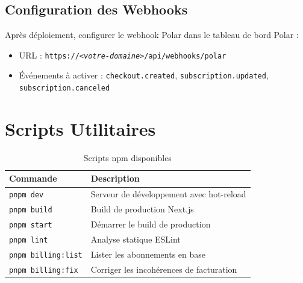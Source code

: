 \documentclass[12pt, a4paper, twoside]{report}
\begin{document}
\subsection{Configuration des Webhooks}

Après déploiement, configurer le webhook Polar dans le tableau de bord Polar :

\begin{itemize}
  \item URL : \texttt{https://\textit{<votre-domaine>}/api/webhooks/polar}
  \item Événements à activer : \texttt{checkout.created},
        \texttt{subscription.updated}, \texttt{subscription.canceled}
\end{itemize}

\section{Scripts Utilitaires}

\begin{table}[H]
  \begin{tabularx}{\textwidth}{|l|X|}
    \hline
    \textbf{Commande} & \textbf{Description} \\
    \hline
    \texttt{pnpm dev}            & Serveur de développement avec hot-reload \\
    \texttt{pnpm build}          & Build de production Next.js \\
    \texttt{pnpm start}          & Démarrer le build de production \\
    \texttt{pnpm lint}           & Analyse statique ESLint \\
    \texttt{pnpm billing:list}   & Lister les abonnements en base \\
    \texttt{pnpm billing:fix}    & Corriger les incohérences de facturation \\
    \hline
  \end{tabularx}
  \caption{Scripts npm disponibles}
  \label{tab:scripts}
\end{table}
\end{document}
